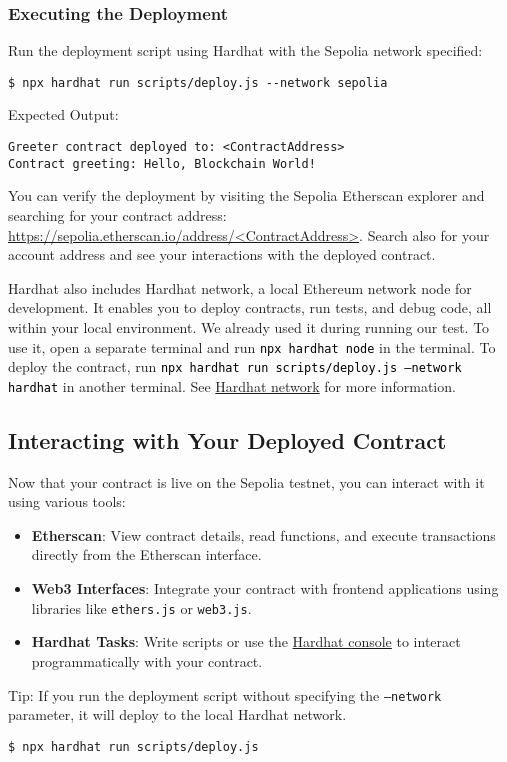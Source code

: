 \documentclass[12pt]{article}
\newcommand{\codegrey}[1]{%
  \texttt{\colorbox{black!4}{\textcolor{black}{#1}}}%
}
\begin{document}
\subsubsection{Executing the Deployment}

Run the deployment script using Hardhat with the Sepolia network specified:

\begin{verbatim}
$ npx hardhat run scripts/deploy.js --network sepolia
\end{verbatim}
Expected Output:
\begin{verbatim}
Greeter contract deployed to: <ContractAddress>
Contract greeting: Hello, Blockchain World!
\end{verbatim}
You can verify the deployment by visiting the Sepolia Etherscan explorer and
searching for your contract address:
\url{https://sepolia.etherscan.io/address/<ContractAddress>}. Search also for
your account address and see your interactions with the deployed contract.

\noindent
Hardhat also includes Hardhat network, a local Ethereum network node for development. It enables you to deploy contracts, run tests, and debug code, all within your local environment. We already used it during running our test. To use it, open a separate terminal and run \codegrey{npx hardhat node} in the terminal. To deploy the contract, run \codegrey{npx hardhat run scripts/deploy.js --network hardhat} in another terminal. See \href{https://hardhat.org/hardhat-network/docs/overview\#hardhat-network}{Hardhat network} for more information.

\subsection{Interacting with Your Deployed Contract}

Now that your contract is live on the Sepolia testnet, you can interact with it
using various tools:

\begin{itemize}
    \item \textbf{Etherscan}: View contract details, read functions, and execute transactions directly from the Etherscan interface.

    \item \textbf{Web3 Interfaces}: Integrate your contract with frontend applications using libraries like \texttt{ethers.js} or \texttt{web3.js}.

    \item \textbf{Hardhat Tasks}: Write scripts or use the \href{https://hardhat.org/hardhat-runner/docs/guides/hardhat-console}{Hardhat console} to interact programmatically with your contract.
\end{itemize}
Tip: If you run the deployment script without specifying the \texttt{--network} parameter, it will deploy to the local Hardhat network.
\begin{verbatim}
$ npx hardhat run scripts/deploy.js
\end{verbatim}
\end{document}
